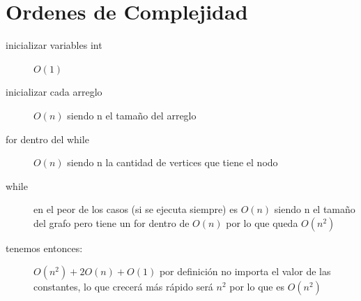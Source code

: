 \documentclass[a4paper,11pt]{article}
\begin{document}
\section*{Ordenes de Complejidad}
\begin{description}
  \item[inicializar variables int] $O(1)$
  \item[inicializar cada arreglo] $O (n)$ siendo n el tamaño del arreglo
  \item[for dentro del while] $O (n)$ siendo n la cantidad de vertices que tiene el nodo
  \item[while] en el peor de los casos (si se ejecuta siempre) es $O(n)$  siendo n el tamaño del grafo pero tiene un for dentro de $O(n)$ por lo que queda $O(n^{2})$
  \item[tenemos entonces:] $O(n^{2}) + 2 O (n) + O(1)$ por definición no importa el valor de las constantes, lo que crecerá más rápido será $n^{2}$ por lo que es $O(n^{2})$
\end{description}
\end{document}
